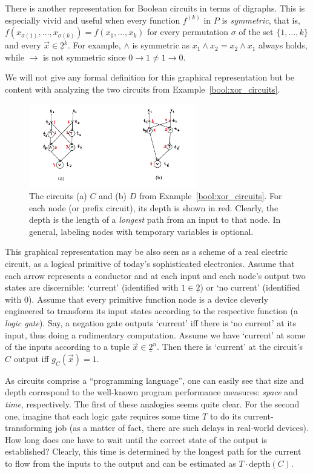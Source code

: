 \documentclass[12pt,notitlepage]{article}
\theoremstyle{plain}
\theoremstyle{definition}
\theoremstyle{plain}
\newcommand{\ul}[1]{\underline{#1}}
\newcommand{\1}{\mathbf{1}}
\newcommand{\0}{\mathbf{0}}
\begin{document}
There is another representation for Boolean circuits in terms of digraphs. This is especially vivid and useful when every function $f^{(k)}$ in $P$ is \emph{symmetric}, that is, $f(x_{\sigma(1)}, \ldots, x_{\sigma(k)}) = f(x_1, \ldots, x_k)$ for every permutation $\sigma$ of the set $\{1,\ldots, k\}$ and every $\vec x \in \ul{2}^k$. For example, $\wedge$ is symmetric as $x_1 \wedge x_2 = x_2 \wedge x_1$ always holds, while $\to$ is not symmetric since $0 \to 1 \neq 1 \to 0$.

We will not give any formal definition for this graphical representation but be content with analyzing the two circuits from Example~\ref{bool:xor_circuits}.

\begin{figure}[h]
	\centering
	\includegraphics*[width=0.65\textwidth]{circuits_exm.pdf}
	\caption{The circuits (a) $C$ and (b) $D$ from Example~\ref{bool:xor_circuits}. For each node (or prefix circuit), its depth is shown in red. Clearly, the depth is the length of a \emph{longest} path from an input to that node. In general, labeling nodes with temporary variables is optional.}
\end{figure}

This graphical representation may be also seen as a scheme of a real electric circuit, as a logical primitive of today's sophisticated electronics. Assume that each arrow represents a conductor and at each input and each node's output two states are discernible: `current' (identified with $1 \in \ul{2}$) or `no current' (identified with $0$). Assume that every primitive function node is a device cleverly engineered to transform its input states according to the respective function (a \emph{logic gate}). Say, a negation gate outputs `current' iff there is `no current' at its input, thus doing a rudimentary computation. Assume we have `current' at some of the inputs according to a tuple $\vec x \in \ul{2}^n$. Then there is `current' at the circuit's $C$ output iff $g_C(\vec x) = 1$.

As circuits comprise a ``programming language'', one can easily see that size and depth correspond to the well-known program performance measures: \emph{space} and \emph{time}, respectively. The first of these analogies seems quite clear. For the second one, imagine that each logic gate requires some time $T$ to do its current-transforming job (as a matter of fact, there are such delays in real-world devices). How long does one have to wait until the correct state of the output is established? Clearly, this time is determined by the longest path for the current to flow from the inputs to the output and can be estimated as $T \cdot \mathrm{depth}(C)$.
\end{document}
